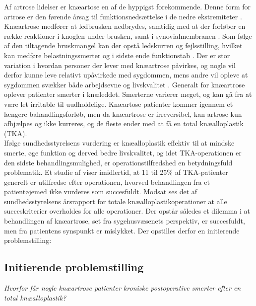 Af artrose lidelser er knæartose en af de hyppigst forekommende. Denne form for artrose er den førende årsag til funktionsnedsættelse i de nedre ekstremiteter \citep{bezwick2012}. 
Knæartrose medfører at ledbrusken nedbrydes, samtidig med at der forløber en række reaktioner i knoglen under brusken, samt i synovialmembranen \citep{brostrom2012}. Som følge af den tiltagende bruskmangel kan der opstå ledskurren og fejlsstilling, hvilket kan medføre belastningssmerter og i sidste ende funktionstab \citep{ugeskrift2011}.
Der er stor variation i hvordan personer der lever med knæartrose påvirkes, og nogle vil derfor kunne leve relativt upåvirkede med sygdommen, mens andre vil opleve at sygdommen svækker både arbejdsevne og livskvalitet \citep{sygdom}.
Generalt for knæartrose oplever patienter smerter i knæleddet. Smerterne varierer meget, og kan gå fra at være let irritable til uudholdelige. Knæartose patienter kommer igennem et længere bahandlingsforløb, men da knæartrose er irreversibel, kan artrose kun afhjælpes og ikke kurreres, og de fleste ender med at få en total knæalloplastik (TKA).\\ 
Ifølge sundhedsstyrelsens vurdering er knæalloplastik effektiv til at mindske smerte, øge funktion og derved bedre livskvalitet, og idet TKA-operationen er den sidste behandlingsmulighed, er operationstilfredshed en betydningsfuld problematik. %
Et studie af  viser imidlertid, at 11 til 25\% af TKA-patienter generelt er utilfredse efter operationen, hvorved behandlingen fra et patientøjemed ikke vurderes som succesfuldt.
Modsat ses det af sundhedsstyrelsens årsrapport for totale knæalloplastikoperationer at alle succeskriterier overholdes for alle operationer. \citep{aarsrapport2016} 
Der opstår således et dilemma i at behandlingen af knæartrose, set fra sygehusvæsenets perspektiv, er succesfuldt, men fra patientens synspunkt er mislykket.
Der opstilles derfor en initierende problemstilling:

\subsection*{Initierende problemstilling}
\begin{center}
	\textit{Hvorfor får nogle knæartrose patienter kroniske postoperative smerter efter en total knæalloplastik?}
\end{center}


